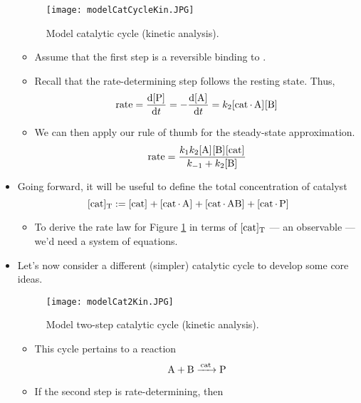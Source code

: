 \documentclass[../notes.tex]{subfiles}
\begin{document}
\begin{itemize}
\begin{figure}[h!]
        \centering
        \texttt{[image: modelCatCycleKin.JPG]}
        \caption{Model catalytic cycle (kinetic analysis).}
        \label{fig:modelCatCycleKin}
    \end{figure}
    \begin{itemize}
        \item Assume that the first step is a reversible binding to .
        \item Recall that the rate-determining step follows the resting state. Thus,
        \begin{equation*}
            \rate = \dv{\cnc{P}}{t}
            = -\dv{\cnc{A}}{t}
            = k_2\cnc{cat*A}\cnc{B}
        \end{equation*}
        \item We can then apply our rule of thumb for the steady-state approximation.
        \begin{equation*}
            \rate = \frac{k_1k_2\cnc{A}\cnc{B}\cnc{cat}}{k_{-1}+k_2\cnc{B}}
        \end{equation*}
    \end{itemize}
    \item Going forward, it will be useful to define the total concentration of catalyst
    \begin{equation*}
        \cnc[T]{cat} := \cnc{cat}+\cnc{cat*A}+\cnc{cat*AB}+\cnc{cat*P}
    \end{equation*}
    \begin{itemize}
        \item To derive the rate law for Figure \ref{fig:modelCatCycleKin} in terms of $\cnc[T]{cat}$ --- an observable --- we'd need a system of equations.
    \end{itemize}
    \item Let's now consider a different (simpler) catalytic cycle to develop some core ideas.
    \begin{figure}[h!]
        \centering
        \texttt{[image: modelCat2Kin.JPG]}
        \caption{Model two-step catalytic cycle (kinetic analysis).}
        \label{fig:modelCat2Kin}
    \end{figure}
    \begin{itemize}
        \item This cycle pertains to a reaction
        \begin{equation*}
            \ce{A + B ->[cat] P}
        \end{equation*}
        \item If the second step is rate-determining, then

\end{itemize}
\end{itemize}
\end{document}

